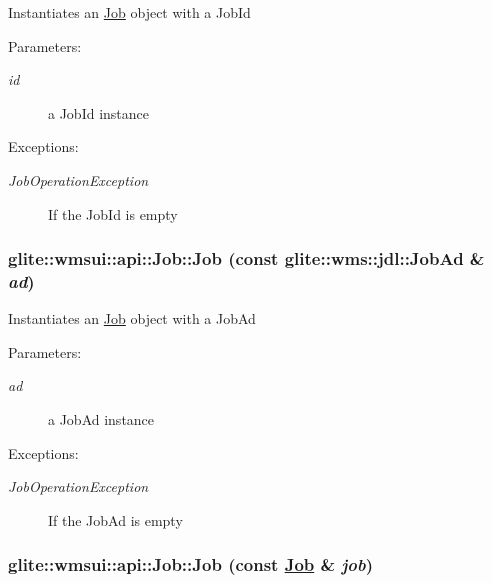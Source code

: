 Instantiates an \hyperlink{classglite_1_1wmsui_1_1api_1_1Job}{Job} object with a Job\-Id \begin{Desc}
\item[Parameters:]
\begin{description}
\item[{\em id}]a Job\-Id instance \end{description}
\end{Desc}
\begin{Desc}
\item[Exceptions:]
\begin{description}
\item[{\em Job\-Operation\-Exception}]If the Job\-Id is empty \end{description}
\end{Desc}
\hypertarget{classglite_1_1wmsui_1_1api_1_1Job_z15_2}{
\subsubsection[Job]{\setlength{\rightskip}{0pt plus 5cm}glite::wmsui::api::Job::Job (const glite::wms::jdl::Job\-Ad \& {\em ad})}}
\label{classglite_1_1wmsui_1_1api_1_1Job_z15_2}


Instantiates an \hyperlink{classglite_1_1wmsui_1_1api_1_1Job}{Job} object with a Job\-Ad \begin{Desc}
\item[Parameters:]
\begin{description}
\item[{\em ad}]a Job\-Ad instance \end{description}
\end{Desc}
\begin{Desc}
\item[Exceptions:]
\begin{description}
\item[{\em Job\-Operation\-Exception}]If the Job\-Ad is empty \end{description}
\end{Desc}
\hypertarget{classglite_1_1wmsui_1_1api_1_1Job_z15_3}{
\subsubsection[Job]{\setlength{\rightskip}{0pt plus 5cm}glite::wmsui::api::Job::Job (const \hyperlink{classglite_1_1wmsui_1_1api_1_1Job}{Job} \& {\em job})}}
\label{classglite_1_1wmsui_1_1api_1_1Job_z15_3}


